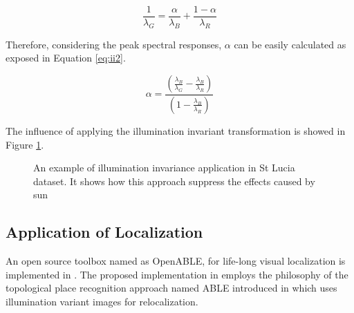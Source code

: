 \begin{equation}
\frac{1}{\lambda_G}=\frac{\alpha}{\lambda_B}+\frac{1-\alpha}{\lambda_R}
\label{eq:ii1}
\end{equation}

Therefore, considering the peak spectral responses, $\alpha$ can be easily calculated as exposed in Equation \ref{eq:ii2}.

\begin{equation}
\alpha=\frac{(\frac{\lambda_B}{\lambda_G}-\frac{\lambda_B}{\lambda_R})}{(1-\frac{\lambda_B}{\lambda_R})}
\label{eq:ii2}
\end{equation}

The influence of applying the illumination invariant transformation is showed in Figure \ref{fig:iicompare1}.

\begin{figure}
	\centering
	\caption{An example of illumination invariance application in St Lucia dataset. It shows how this approach suppress the effects caused by sun}
	\label{fig:iicompare1}
\end{figure}

\subsection{Application of Localization}
An open source toolbox named as OpenABLE, for life-long visual localization is implemented in \cite{arroyo2016openable}. The proposed implementation in \cite{arroyo2016openable} employs the philosophy of the topological place recognition approach named ABLE introduced in \cite{arroyo2014bidirectional, arroyo2014fast, arroyo2015towards} which uses illumination variant images for relocalization.

